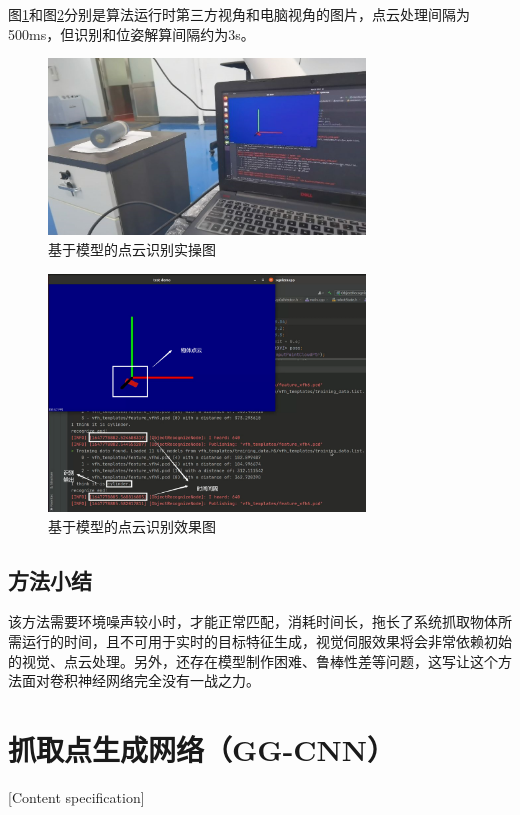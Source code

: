 \documentclass[fontset=fandol,type=bachelor,campus=harbin]{hithesisbook}
\begin{document}
图\ref{基于模型的点云识别实操图}和图\ref{基于模型的点云识别效果图}分别是算法运行时第三方视角和电脑视角的图片，点云处理间隔为500ms，但识别和位姿解算间隔约为3s。
\newpage
\begin{figure}[h]
\centering
\includegraphics[width = 0.75\textwidth]{chapter3/基于模型的点云识别实操图}
\caption{基于模型的点云识别实操图}
\label{基于模型的点云识别实操图}
\end{figure}

\begin{figure}[h]
\centering
\includegraphics[width = 0.75\textwidth]{chapter3/基于模型的点云识别效果图}
\caption{基于模型的点云识别效果图}
\label{基于模型的点云识别效果图}
\end{figure}
\subsection{方法小结}
该方法需要环境噪声较小时，才能正常匹配，消耗时间长，拖长了系统抓取物体所需运行的时间，且不可用于实时的目标特征生成，视觉伺服效果将会非常依赖初始的视觉、点云处理。另外，还存在模型制作困难、鲁棒性差等问题，这写让这个方法面对卷积神经网络完全没有一战之力。


\section{抓取点生成网络（GG-CNN）}[Content specification]
\end{document}
